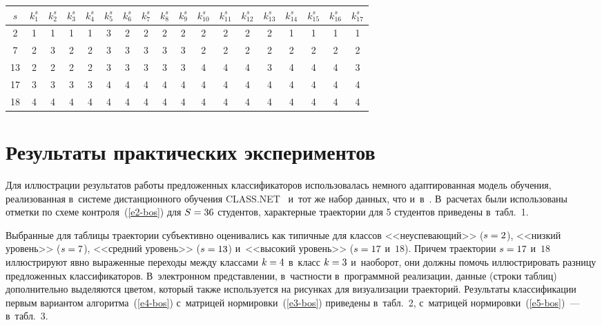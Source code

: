 \begin{multicols}{2}
\begin{table*}
\begin{center}
      \begin{tabular}{|c|c|c|c|c|c|c|c|c|c|c|c|c|c|c|c|c|c|}
      \hline
$s$&$k_1^s$&$k_2^s$&$k_3^s$&$k_4^s$&$k_5^s$&$k_6^s$&$k_7^s$&$k_8^s$&$k_9^s$&$k^s_{10}
$&$k^s_{11}$&$k^s_{12}$&$k^s_{13}$&$k^s_{14}$&$k^s_{15}$&$k^s_{16}$&$k_{17}^s$\\
\hline
\hphantom{9}2&1&1&1&1&3&2&2&2&2&2&2&2&2&1&1&1&1\\
\hphantom{9}7&2&3&2&2&3&3&3&3&3&2&2&2&2&2&2&2&2\\
13&2&2&2&2&3&3&3&3&3&4&4&4&3&4&4&4&3\\
17&3&3&3&3&4&4&4&4&4&4&4&4&4&4&4&4&4\\
18&4&4&4&4&4&4&4&4&4&4&4&4&4&4&4&4&4\\
\hline
\end{tabular}
\end{center}
\vspace*{-3pt}
\end{table*}
                                   
     
                                   

     
\section{Результаты практических экспериментов}

     Для иллюстрации результатов работы предложенных классификаторов 
использовалась немного адаптированная модель обучения, реализованная 
в~системе дистанционного обучения CLASS.NET~\cite{15-bos} и~тот же 
набор данных, что и~в~\cite{8-bos}. В~расчетах были использованы отметки 
по схеме контроля~(\ref{e2-bos}) для $S\hm=36$ студентов, характерные 
траектории для 5 студентов приведены в~табл.~1.

\pagebreak
     
     
     Выбранные для таблицы траектории субъективно оценивались как 
типичные для классов <<неуспевающий>> ($s\hm=2$), <<низкий уровень>> 
($s\hm=7$), <<средний уровень>> ($s\hm=13$) и~<<высокий уровень>> 
($s\hm=17$ и~$18$). Причем траектории $s\hm=17$ и~$18$ 
иллюстрируют явно выраженные переходы между классами $k\hm=4$ 
в~класс $k\hm=3$ и~наоборот, они должны помочь иллюстрировать разницу 
предложенных классификаторов. В~электронном представлении, в~частности в~программной реализации, данные (строки таблиц) дополнительно 
выделяются цветом, который также используется на рисунках для 
визуализации траекторий. Результаты классификации первым вариантом 
алгоритма~(\ref{e4-bos}) с~матрицей нормировки~(\ref{e3-bos}) приведены 
в~табл.~2, с~матрицей нормировки~(\ref{e5-bos})~--- в~табл.~3.
     


\end{multicols}
